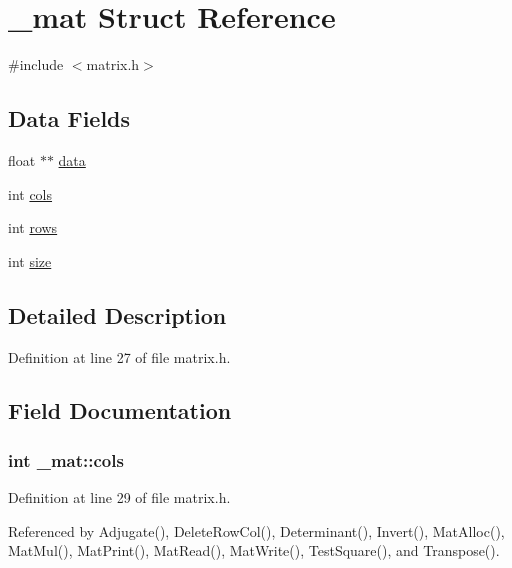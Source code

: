 \hypertarget{struct__mat}{}\section{\+\_\+mat Struct Reference}
\label{struct__mat}


{\ttfamily \#include $<$matrix.\+h$>$}

\subsection*{Data Fields}
\begin{DoxyCompactItemize}
\item 
float $\ast$$\ast$ \hyperlink{struct__mat_a00dcd82a8de11b7f16f7edfde55bcfae}{data}
\item 
int \hyperlink{struct__mat_a5ee73c0c8484d47a000464681b298762}{cols}
\item 
int \hyperlink{struct__mat_a5e6bcb8b0c0239ca9b782c48b0b3c98a}{rows}
\item 
int \hyperlink{struct__mat_ab54203ad7b60fc23832cb3b2a863857f}{size}
\end{DoxyCompactItemize}


\subsection{Detailed Description}


Definition at line 27 of file matrix.\+h.



\subsection{Field Documentation}
\subsubsection[{\texorpdfstring{cols}{cols}}]{\setlength{\rightskip}{0pt plus 5cm}int \+\_\+mat\+::cols}\hypertarget{struct__mat_a5ee73c0c8484d47a000464681b298762}{}\label{struct__mat_a5ee73c0c8484d47a000464681b298762}


Definition at line 29 of file matrix.\+h.



Referenced by Adjugate(), Delete\+Row\+Col(), Determinant(), Invert(), Mat\+Alloc(), Mat\+Mul(), Mat\+Print(), Mat\+Read(), Mat\+Write(), Test\+Square(), and Transpose().

